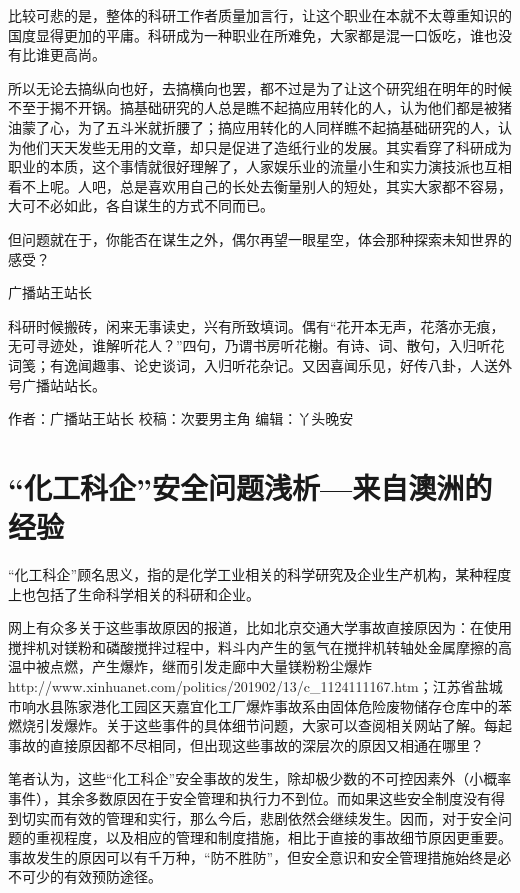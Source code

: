 \documentclass[]{book}
\begin{document}
比较可悲的是，整体的科研工作者质量加言行，让这个职业在本就不太尊重知识的国度显得更加的平庸。科研成为一种职业在所难免，大家都是混一口饭吃，谁也没有比谁更高尚。

所以无论去搞纵向也好，去搞横向也罢，都不过是为了让这个研究组在明年的时候不至于揭不开锅。搞基础研究的人总是瞧不起搞应用转化的人，认为他们都是被猪油蒙了心，为了五斗米就折腰了；搞应用转化的人同样瞧不起搞基础研究的人，认为他们天天发些无用的文章，却只是促进了造纸行业的发展。其实看穿了科研成为职业的本质，这个事情就很好理解了，人家娱乐业的流量小生和实力演技派也互相看不上呢。人吧，总是喜欢用自己的长处去衡量别人的短处，其实大家都不容易，大可不必如此，各自谋生的方式不同而已。

但问题就在于，你能否在谋生之外，偶尔再望一眼星空，体会那种探索未知世界的感受？

广播站王站长

科研时候搬砖，闲来无事读史，兴有所致填词。偶有``花开本无声，花落亦无痕，无可寻迹处，谁解听花人？''四句，乃谓书房听花榭。有诗、词、散句，入归听花词笺；有逸闻趣事、论史谈词，入归听花杂记。又因喜闻乐见，好传八卦，人送外号广播站站长。

作者：广播站王站长
校稿：次要男主角
编辑：丫头晚安

\hypertarget{ux5316ux5de5ux79d1ux4f01ux5b89ux5168ux95eeux9898ux6d45ux6790ux6765ux81eaux6fb3ux6d32ux7684ux7ecfux9a8c}{%
\section{``化工科企''安全问题浅析---来自澳洲的经验}\label{ux5316ux5de5ux79d1ux4f01ux5b89ux5168ux95eeux9898ux6d45ux6790ux6765ux81eaux6fb3ux6d32ux7684ux7ecfux9a8c}}

``化工科企''顾名思义，指的是化学工业相关的科学研究及企业生产机构，某种程度上也包括了生命科学相关的科研和企业。

网上有众多关于这些事故原因的报道，比如北京交通大学事故直接原因为：在使用搅拌机对镁粉和磷酸搅拌过程中，料斗内产生的氢气在搅拌机转轴处金属摩擦的高温中被点燃，产生爆炸，继而引发走廊中大量镁粉粉尘爆炸http://www.xinhuanet.com/politics/201902/13/c\_1124111167.htm；江苏省盐城市响水县陈家港化工园区天嘉宜化工厂爆炸事故系由固体危险废物储存仓库中的苯燃烧引发爆炸。关于这些事件的具体细节问题，大家可以查阅相关网站了解。每起事故的直接原因都不尽相同，但出现这些事故的深层次的原因又相通在哪里？

笔者认为，这些``化工科企''安全事故的发生，除却极少数的不可控因素外（小概率事件），其余多数原因在于安全管理和执行力不到位。而如果这些安全制度没有得到切实而有效的管理和实行，那么今后，悲剧依然会继续发生。因而，对于安全问题的重视程度，以及相应的管理和制度措施，相比于直接的事故细节原因更重要。事故发生的原因可以有千万种，``防不胜防''，但安全意识和安全管理措施始终是必不可少的有效预防途径。
\end{document}
